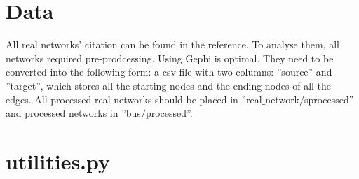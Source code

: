 \documentclass[12pt]{article}
\begin{document}
\appendix
\section{Data}
All real networks' citation can be found in the reference. To analyse them, all networks required pre-prodcessing. Using Gephi is optimal. They need to be converted into the following form: a csv file with two columns: ''source'' and ''target'', which stores all the starting nodes and the ending nodes of all the edges. All processed real networks should be placed in ''real$\_$network$/$sprocessed'' and processed networks in ''bus$/$processed''.

\section{utilities.py}
\label{utilities_code}
\end{document}
